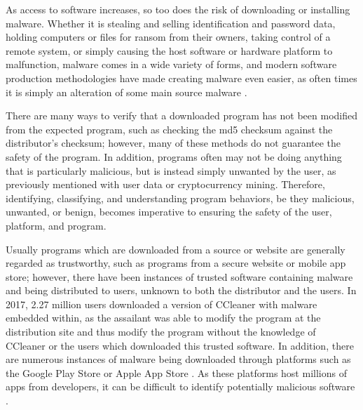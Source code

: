 As access to software increases, so too does the risk of downloading or installing malware. Whether it is stealing and selling identification and password data, holding computers or files for ransom from their owners, taking control of a remote system, or simply causing the host software or hardware platform to malfunction, malware comes in a wide variety of forms, and modern software production methodologies have made creating malware even easier, as often times it is simply an alteration of some main source malware \cite{maier2014divide}.

There are many ways to verify that a downloaded program has not been modified from the expected program, such as checking the md5 checksum against the distributor's checksum; however, many of these methods do not guarantee the safety of the program. In addition, programs often may not be doing anything that is particularly malicious, but is instead simply unwanted by the user, as previously mentioned with user data or cryptocurrency mining. Therefore, identifying, classifying, and understanding program behaviors, be they malicious, unwanted, or benign, becomes imperative to ensuring the safety of the user, platform, and program. 

Usually programs which are downloaded from a source or website are generally regarded as trustworthy, such as programs from a secure website or mobile app store; however, there have been instances of trusted software containing malware and being distributed to users, unknown to both the distributor and the users. In 2017, 2.27 million users downloaded a version of CCleaner with malware embedded within, as the assailant was able to modify the program at the distribution site and thus modify the program without the knowledge of CCleaner or the users which downloaded this trusted software\cite{arntz_ccleaner_2017}. In addition, there are numerous instances of malware being downloaded through platforms such as the Google Play Store or Apple App Store \cite{maier2014divide}. As these platforms host millions of apps from developers, it can be difficult to identify potentially malicious software \cite{statista}.